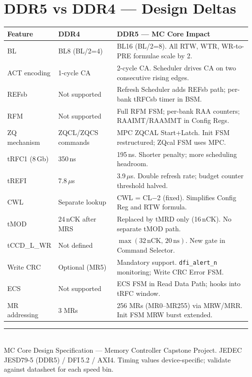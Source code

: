 \documentclass[10pt,a4paper]{article}
\newcommand{\Th}[1]{\cellcolor{cellbg}\textbf{\small #1}}
\newcommand{\RA}{\rowcolor{white}}
\newcommand{\RB}{\rowcolor{altbg}}
\begin{document}
\section{DDR5 vs DDR4 --- Design Deltas}

\begin{center}
\begin{tabularx}{\linewidth}{@{} l l X @{}}
\toprule
\Th{Feature} & \Th{DDR4} & \Th{DDR5 --- MC Core Impact} \\
\midrule
\RA BL & BL8 (BL/2=4) & BL16 (BL/2=8). All RTW, WTR, WR-to-PRE formulae scale by 2. \\
\RB ACT encoding & 1-cycle CA & 2-cycle CA. Scheduler drives CA on two consecutive rising edges. \\
\RA REFsb & Not supported & Refresh Scheduler adds REFsb path; per-bank tRFCsb timer in BSM. \\
\RB RFM & Not supported & Full RFM FSM; per-bank RAA counters; RAAIMT/RAAMMT in Config Regs. \\
\RA ZQ mechanism & ZQCL/ZQCS commands & MPC ZQCAL Start+Latch. Init FSM restructured; ZQcal FSM uses MPC. \\
\RB tRFC1 (8\,Gb) & 350\,ns & 195\,ns. Shorter penalty; more scheduling headroom. \\
\RA tREFI & 7.8\,$\mu$s & 3.9\,$\mu$s. Double refresh rate; budget counter threshold halved. \\
\RB CWL & Separate lookup & CWL = CL$-$2 (fixed). Simplifies Config Reg and RTW formula. \\
\RA tMOD & 24\,nCK after MRS & Replaced by tMRD only (16\,nCK). No separate tMOD path. \\
\RB tCCD\_L\_WR & Not defined & $\max(32\,\text{nCK},\,20\,\text{ns})$. New gate in Command Selector. \\
\RA Write CRC & Optional (MR5) & Mandatory support. \texttt{dfi\_alert\_n} monitoring; Write CRC Error FSM. \\
\RB ECS & Not supported & ECS FSM in Read Data Path; hooks into tRFC window. \\
\RA MR addressing & 3 MRs & 256 MRs (MR0--MR255) via MRW/MRR. Init FSM MRW burst extended. \\
\bottomrule
\end{tabularx}
\end{center}

\vspace{10pt}
\noindent\color{ruleclr}\rule{\linewidth}{0.4pt}\\[2pt]
{\small\color{notetext}
MC Core Design Specification --- Memory Controller Capstone Project.
JEDEC JESD79-5 (DDR5) / DFI\,5.2 / AXI4. Timing values device-specific;
validate against datasheet for each speed bin.}
\end{document}
